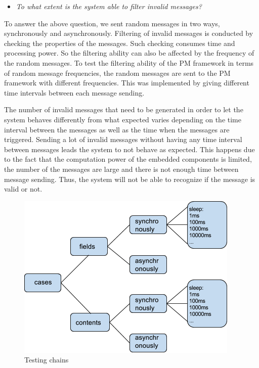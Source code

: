  \begin{itemize}
 \item {\em To what extent is the system able to filter invalid messages?} 
 \end{itemize}
 
 To answer the above question, we sent random messages in two ways, synchronously and asynchronously.
Filtering of invalid messages is conducted by checking the properties of the messages. Such checking consumes time and processing power. So the filtering ability can also be affected by the frequency of the random messages. To test the filtering ability of the PM framework in terms of random message frequencies, the random messages are sent to the PM framework with different frequencies. This was implemented by giving different time intervals between each message sending. 

The number of invalid messages that need to be generated in order to let the system behaves differently from what expected varies depending on the time interval between the messages as well as the time when the messages are triggered. Sending a lot of invalid messages without having any time interval between messages leads the system to not behave as expected. This happens due to the fact that the computation power of the embedded components is limited, the number of the messages are large and there is not enough time between message sending. Thus, the system will not be able to recognize if the message is valid or not. 

\begin{figure}[h!]
\centering
\includegraphics[width=.8\columnwidth]{figure/testingchain.png}
\caption{Testing chains \label{testingchain}}
\end{figure}

